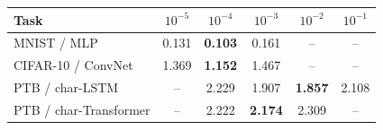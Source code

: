 \begin{tabular}{l ccccc}
\toprule
Task & $10^{-5}$ & $10^{-4}$ & $10^{-3}$ & $10^{-2}$ & $10^{-1}$ \\
\midrule
MNIST / MLP & 0.131 & \textbf{0.103} & 0.161 & -- & -- \\
CIFAR-10 / ConvNet & 1.369 & \textbf{1.152} & 1.467 & -- & -- \\
PTB / char-LSTM & -- & 2.229 & 1.907 & \textbf{1.857} & 2.108 \\
PTB / char-Transformer & -- & 2.222 & \textbf{2.174} & 2.309 & -- \\
\bottomrule
\end{tabular}
